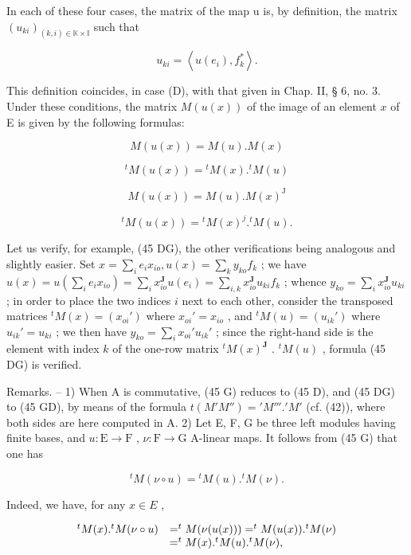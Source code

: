 In each of these four cases, the matrix of the map u is, by definition, the matrix \((u_{ki})_{(k,i)\in\mathbb{K}\times\mathbb{I}}\) such that

\[
u _ {k i} = \left\langle u (e _ {i}), f _ {k} ^ {*} \right\rangle .\tag{44}
\]

This definition coincides, in case (D), with that given in Chap. II, § 6, no. 3. Under these conditions, the matrix \(M(u(x))\) of the image of an element \(x\) of E is given by the following formulas:

\[
M (u (x)) = M (u). M (x)\tag{45 D}
\]

\[
{ } ^ { t } M ( u ( x ) ) = { } ^ { t } M ( x ) . { } ^ { t } M ( u )\tag{45 G}
\]

\[
M (u (x)) = M (u). M (x) ^ {\mathrm{J}}\tag{45 GD}
\]

\[
{ } ^ { t } M ( u ( x ) ) = { } ^ { t } M ( x ) ^ { j } . { } ^ { t } M ( u ) .\tag{45 DG}
\]

Let us verify, for example, (45 DG), the other verifications being analogous and slightly easier. Set \(x = \sum_{i} e_i x_{io}, u(x) = \sum_{k} y_{ko} f_k\) ; we have \(u(x) = u(\sum_{i} e_i x_{io}) = \sum_{i} x_{io}^{\mathbf{J}} u(e_i) = \sum_{i,k} x_{io}^{\mathbf{J}} u_{ki} f_k\) ; whence \(y_{ko} = \sum_{i} x_{io}^{\mathbf{J}} u_{ki}\) ; in order to place the two indices \(i\) next to each other, consider the transposed matrices \(^t M(x) = (x_{oi}')\) where \(x_{oi}' = x_{io}\) , and \(^t M(u) = (u_{ik}')\) where \(u_{ik}' = u_{ki}\) ; we then have \(y_{ko} = \sum_{i} x_{oi}' u_{ik}'\) ; since the right-hand side is the element with index \(k\) of the one-row matrix \(^t M(x)^{\mathbf{J}}\) . \(^t M(u)\) , formula (45 DG) is verified.

Remarks. -- 1) When A is commutative, (45 G) reduces to (45 D), and (45 DG) to (45 GD), by means of the formula \(t(M'M'') = 'M'''.'M'\) (cf. (42)), where both sides are here computed in A. 2) Let E, F, G be three left modules having finite bases, and \(u: \mathrm{E} \to \mathrm{F}\) , \(\nu: \mathrm{F} \to \mathrm{G}\) A-linear maps. It follows from (45 G) that one has

\[
{ } ^ { t } M ( \nu \circ u ) = { } ^ { t } M ( u ) . { } ^ { t } M ( \nu ) .\tag{46}
\]

Indeed, we have, for any \(x \in E\) ,

\[
\begin{array}{r l} ^ {t} M (x). ^ {t} M (\nu \circ u) & = ^ {t} M (\nu (u (x))) = ^ {t} M (u (x)). ^ {t} M (\nu) \\ & = ^ {t} M (x). ^ {t} M (u). ^ {t} M (\nu), \end{array}
\]


